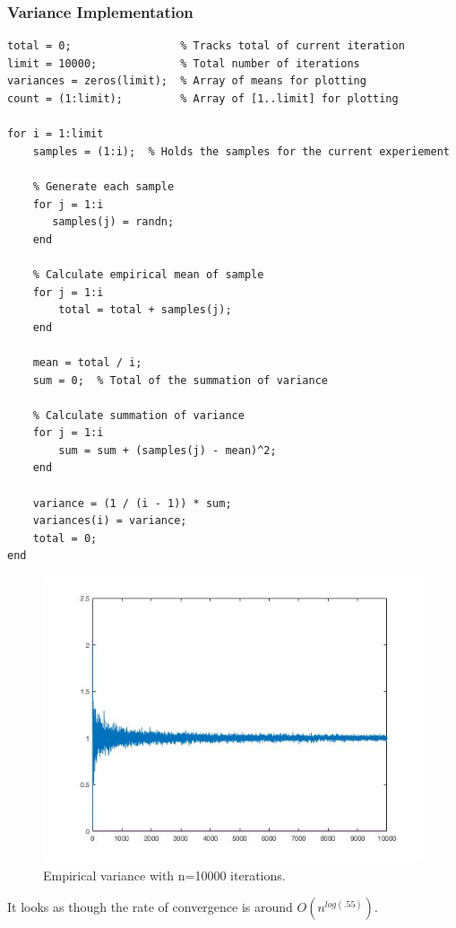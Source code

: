 \documentclass[11pt, oneside]{article}   	%
\begin{document}
\subsubsection{Variance Implementation}
\begin{verbatim}
total = 0;                 % Tracks total of current iteration
limit = 10000;             % Total number of iterations
variances = zeros(limit);  % Array of means for plotting
count = (1:limit);         % Array of [1..limit] for plotting

for i = 1:limit
    samples = (1:i);  % Holds the samples for the current experiement
    
    % Generate each sample
    for j = 1:i
       samples(j) = randn;
    end
    
    % Calculate empirical mean of sample
    for j = 1:i
        total = total + samples(j);
    end
    
    mean = total / i;
    sum = 0;  % Total of the summation of variance
    
    % Calculate summation of variance
    for j = 1:i
        sum = sum + (samples(j) - mean)^2;
    end
    
    variance = (1 / (i - 1)) * sum;
    variances(i) = variance;
    total = 0;
end
\end{verbatim}

\newpage{}
\begin{figure}
  \includegraphics[width=\linewidth]{variance.jpg}
  \caption{Empirical variance with n=10000 iterations.}
\end{figure}

It looks as though the rate of convergence is around $O(n^{log(.55)})$.
\end{document}
